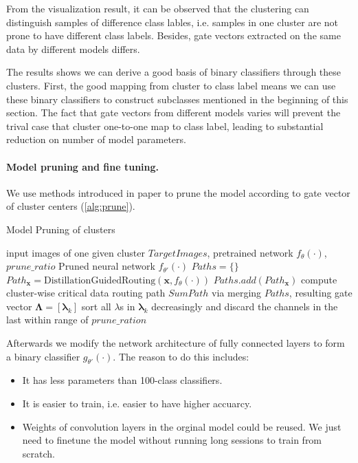 \documentclass[sigplan,10pt,review]{acmart}\settopmatter{printfolios=true,printccs=false,printacmref=false}
\begin{document}
From the visualization result, it can be observed that the clustering can distinguish samples of difference class lables, i.e. samples in one cluster are not prone to have different class labels. Besides, gate vectors extracted on the same data by different models differs.

The results shows we can derive a good basis of binary classifiers through these clusters. First, the good mapping from cluster to class label means we can use these binary classifiers to construct subclasses mentioned in the beginning of this section. The fact that gate vectors from different models varies will prevent the trival case that cluster one-to-one map to class label, leading to substantial reduction on number of model parameters.

\paragraph{Model pruning and fine tuning.}

We use methods introduced in paper \cite{LiDongYue} to prune the model according to gate vector of cluster centers (\cref{alg:prune}).

\begin{algorithm}
	\caption{Model Pruning of clusters}
	\label{alg:prune}
	\begin{algorithmic}[1]
		\Require input images of one given cluster $TargetImages$, pretrained network $f_\theta(\cdot)$, $prune\_ratio$
		\Ensure Pruned neural network $f_{\theta'}(\cdot)$
		\State $Paths = \{\}$
			\State $Path_{\boldsymbol{x}} = \mathrm{DistillationGuidedRouting}(\boldsymbol{x}, f_\theta(\cdot))$
			\State $Paths.add(Path_{\boldsymbol{x}})$
		\EndFor		
		\State compute cluster-wise critical data routing path $SumPath$ via merging $Paths$, resulting gate vector $\boldsymbol{\Lambda} = [\boldsymbol{\lambda}_k]$
			\State sort all $\lambda$s in $\boldsymbol{\lambda}_k$ decreasingly and discard the channels in the last within range of $prune\_ration$
		\EndFor
	\end{algorithmic}
\end{algorithm}

Afterwards we modify the network architecture of fully connected layers to form a binary classifier $g_{\theta'}(\cdot)$. The reason to do this includes:
\begin{itemize}
	\item It has less parameters than 100-class classifiers.
	\item It is easier to train, i.e. easier to have higher accuarcy.
	\item Weights of convolution layers in the orginal model could be reused. We just need to finetune the model without running long sessions to train from scratch.
\end{itemize} 
\end{document}
